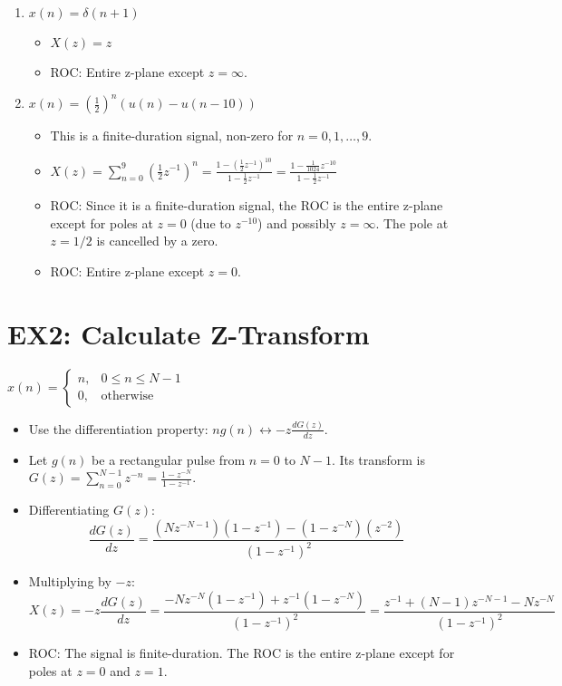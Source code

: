 \documentclass[a4paper,12pt]{article}
\begin{document}
\begin{enumerate}
    \item \textbf{$x(n) = \delta(n+1)$}
        \begin{itemize}
            \item $X(z) = z$
            \item ROC: Entire z-plane except $z=\infty$.
        \end{itemize}
        
    \item \textbf{$x(n) = (\frac{1}{2})^n (u(n) - u(n-10))$}
        \begin{itemize}
            \item This is a finite-duration signal, non-zero for $n=0, 1, \dots, 9$.
            \item $X(z) = \sum_{n=0}^{9} (\frac{1}{2}z^{-1})^n = \frac{1 - (\frac{1}{2}z^{-1})^{10}}{1 - \frac{1}{2}z^{-1}} = \frac{1 - \frac{1}{1024}z^{-10}}{1 - \frac{1}{2}z^{-1}}$
            \item ROC: Since it is a finite-duration signal, the ROC is the entire z-plane except for poles at $z=0$ (due to $z^{-10}$) and possibly $z=\infty$. The pole at $z=1/2$ is cancelled by a zero.
            \item ROC: Entire z-plane except $z=0$.
        \end{itemize}
\end{enumerate}


\section*{EX2: Calculate Z-Transform}
\textbf{$x(n) = \begin{cases} n, & 0 \le n \le N-1 \\ 0, & \text{otherwise} \end{cases}$}
\begin{itemize}
    \item Use the differentiation property: $n g(n) \leftrightarrow -z \frac{dG(z)}{dz}$.
    \item Let $g(n)$ be a rectangular pulse from $n=0$ to $N-1$. Its transform is $G(z) = \sum_{n=0}^{N-1} z^{-n} = \frac{1-z^{-N}}{1-z^{-1}}$.
    \item Differentiating $G(z)$:
    \[ \frac{dG(z)}{dz} = \frac{(Nz^{-N-1})(1-z^{-1}) - (1-z^{-N})(z^{-2})}{(1-z^{-1})^2} \]
    \item Multiplying by $-z$:
    \[ X(z) = -z \frac{dG(z)}{dz} = \frac{-Nz^{-N}(1-z^{-1}) + z^{-1}(1-z^{-N})}{(1-z^{-1})^2} = \frac{z^{-1} + (N-1)z^{-N-1} - Nz^{-N}}{(1-z^{-1})^2} \]
    \item ROC: The signal is finite-duration. The ROC is the entire z-plane except for poles at $z=0$ and $z=1$.
\end{itemize}
\end{document}
